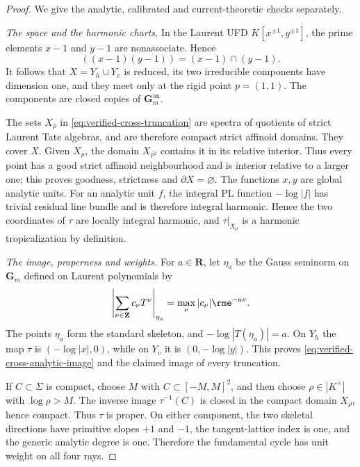 \begin{proof}
We give the analytic, calibrated and current-theoretic checks separately.

\emph{The space and the harmonic charts.}
In the Laurent UFD \(K[x^{\pm1},y^{\pm1}]\), the prime elements
\(x-1\) and \(y-1\) are nonassociate.  Hence
\[
              ((x-1)(y-1))=(x-1)\cap(y-1).
\tag{69.13g}\label{eq:verified-cross-primary-decomposition}
\]
It follows that \(X=Y_h\cup Y_v\) is reduced, its two irreducible
components have dimension one, and they meet only at the rigid point
\(p=(1,1)\).  The components are closed copies of
\(\mathbf G_m^{\mathrm{an}}\).

The sets \(X_\rho\) in \eqref{eq:verified-cross-truncation} are spectra of
quotients of strict Laurent Tate algebras, and are therefore compact strict
affinoid domains.  They cover \(X\).  Given \(X_\rho\), the domain
\(X_{\rho^2}\) contains it in its relative interior.  Thus every point has
a good strict affinoid neighbourhood and is interior relative to a larger
one; this proves goodness, strictness and \(\partial X=\varnothing\).
The functions \(x,y\) are global analytic units.  For an analytic unit
\(f\), the integral PL function \(-\log|f|\) has trivial residual line
bundle and is therefore integral harmonic.  Hence the two coordinates of
\(\tau\) are locally integral harmonic, and \(\tau|_{X_\rho}\) is a
harmonic tropicalization by definition.

\emph{The image, properness and weights.}
For \(a\in\mathbf R\), let \(\eta_a\) be the Gauss seminorm on
\(\mathbf G_m\) defined on Laurent polynomials by
\[
 \left|\sum_{\nu\in\mathbf Z}c_\nu T^\nu\right|_{\eta_a}
       =\max_\nu |c_\nu|\rme^{-a\nu}.
\]
The points \(\eta_a\) form the standard skeleton, and
\(-\log|T(\eta_a)|=a\).  On \(Y_h\) the map \(\tau\) is
\((-\log|x|,0)\), while on \(Y_v\) it is
\((0,-\log|y|)\).  This proves
\eqref{eq:verified-cross-analytic-image} and the claimed image of every
truncation.

If \(C\subset\Sigma\) is compact, choose \(M\) with
\(C\subset[-M,M]^2\), and then choose \(\rho\in|K^\times|\) with
\(\log\rho>M\).  The inverse image \(\tau^{-1}(C)\) is closed in the
compact domain \(X_\rho\), hence compact.  Thus \(\tau\) is proper.
On either component, the two skeletal directions have primitive slopes
\(+1\) and \(-1\), the tangent-lattice index is one, and the generic
analytic degree is one.  Therefore the fundamental cycle has unit weight
on all four rays.


\end{proof}
